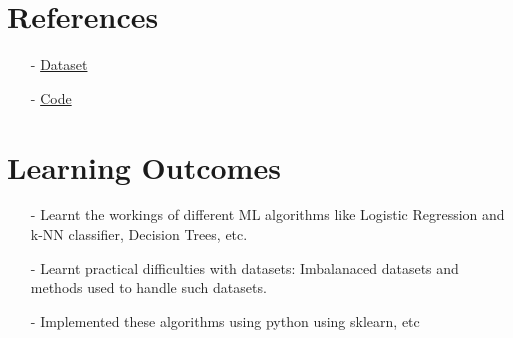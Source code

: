 \documentclass[12pt,a4paper]{article}
\begin{document}




\section{References}
\begin{itemize}
    \item[-] \href{https://www.kaggle.com/datasets/joebeachcapital/credit-card-fraud/}{Dataset}
    \item[-] \href{github}{Code}
\end{itemize}


\section{Learning Outcomes}
\begin{itemize}
    \item[-] Learnt the workings of different ML algorithms like Logistic Regression and k-NN classifier, Decision Trees, etc.
    \item[-] Learnt practical difficulties with datasets: Imbalanaced datasets and methods used to handle such datasets.
    \item[-] Implemented these algorithms using python using sklearn, etc
\end{itemize}


% 
% 
\end{document}
